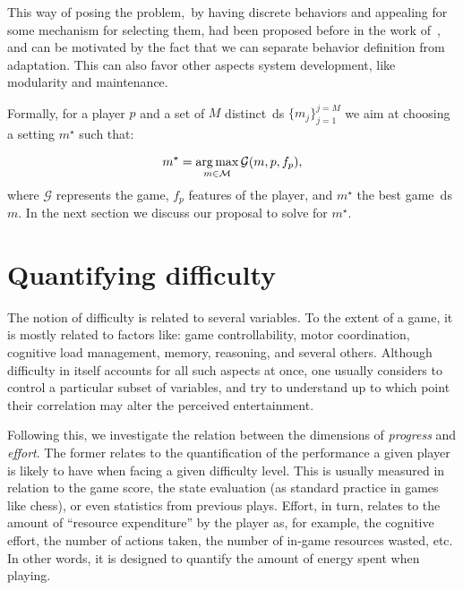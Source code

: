 This way of posing the problem,~\ie by having discrete behaviors and appealing for some mechanism for selecting them, had been proposed before in the work of~\cite{sejrsgaard-jacobsen_dynamic_2011}, and can be motivated by the fact that we can separate behavior definition from adaptation. This can also favor other aspects system development, like modularity and maintenance.

Formally, for a player $p$ and a set of $M$ distinct~\gls{ds} $\{m_{j}\}^{j=M}_{j=1}$ we aim at choosing a setting $m^{\star}$ such that:

\begin{equation}
m^{\star} = \operatorname*{arg\,max}_{m \in \mathcal{M}} \mathcal{G}(m, p, f_{p}),
\end{equation}
where $\mathcal{G}$ represents the game, $f_{p}$ features of the player, and $m^{\star}$ the best game~\gls{ds} $m$. 
In the next section we discuss our proposal to solve for $m^{\star}$.

\section{Quantifying difficulty}\label{sec:quant_difficulty}
The notion of difficulty is related to several variables. To the extent of a game, it is mostly related to factors like: game controllability, motor coordination, cognitive load management, memory, reasoning, and several others. Although difficulty in itself accounts for all such aspects at once, one usually considers to control a particular subset of variables, and try to understand up to which point their correlation may alter the perceived entertainment.

Following this, we investigate the relation between the dimensions of \textit{progress} and \textit{effort}. The former relates to the quantification of the performance a given player is likely to have when facing a given difficulty level. %
This is usually measured in relation to the game score, the state evaluation (as standard practice in games like chess), or even statistics from previous plays. Effort, in turn, relates to the amount of ``resource expenditure'' by the player as, for example, the cognitive effort, the number of actions taken, the number of in-game resources wasted, etc. In other words, it is designed to quantify the amount of energy spent when playing.

